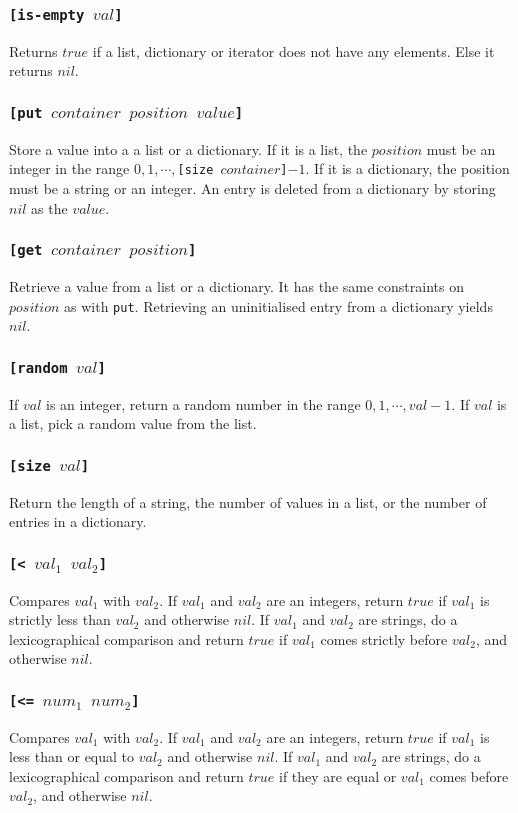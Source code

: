 \documentclass[11pt]{report}
\begin{document}
\subsubsection*{\tt{[is-empty }$val$\tt{]}}
Returns $true$ if a list, dictionary or iterator does not have any elements. Else it returns $nil$.
\subsubsection*{\tt{[put }$container$ $position$ $value$\tt{]}}
Store a value into a a list or a dictionary. If it is a list, the $position$ must be an integer in the range $0,1, \cdots, ${\tt{[size }}$container${\tt{]}}$-1$.
If it is a dictionary, the position must be a string or an integer. An entry is deleted from a dictionary by storing $nil$ as the $value$.
\subsubsection*{\tt{[get }$container$ $position$\tt{]}}
Retrieve a value from a list or a dictionary. It has the same constraints on $position$ as with \verb|put|. Retrieving an uninitialised entry from a dictionary yields $nil$.
\subsubsection*{\tt{[random }$val$\tt{]}}
If $val$ is an integer, return a random number in the range $0,1, \cdots, val -1$. If $val$ is a list, pick a random value from the list.
\subsubsection*{\tt{[size }$val$\tt{]}}
Return the length of a string, the number of values in a list, or the number of entries in a dictionary.
\subsubsection*{\tt{[< }$val_1$ $val_2$\tt{]}}
Compares $val_1$ with $val_2$. If $val_1$ and $val_2$ are an integers, return $true$ if $val_1$ is strictly less than $val_2$ and otherwise $nil$.
If $val_1$ and $val_2$ are strings, do a lexicographical comparison and return $true$ if $val_1$ comes strictly before $val_2$, and otherwise $nil$.
\subsubsection*{\tt{[<= }$num_1$ $num_2$\tt{]}}
Compares $val_1$ with $val_2$. If $val_1$ and $val_2$ are an integers, return $true$ if $val_1$ is less than or equal to $val_2$ and otherwise $nil$.
If $val_1$ and $val_2$ are strings, do a lexicographical comparison and return $true$ if they are equal or $val_1$ comes before $val_2$, and otherwise $nil$.
\end{document}
